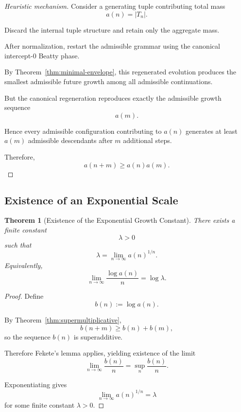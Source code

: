 \documentclass[12pt, oneside]{article}
\numberwithin{equation}{section}
\theoremstyle{definition}
\theoremstyle{plain}
\newtheorem{theorem}{Theorem}[section]
\theoremstyle{remark}
\begin{document}
\begin{proof}[Heuristic mechanism]
Consider a generating tuple contributing total mass
\[
a(n)=|T_n|.
\]

Discard the internal tuple structure and retain only the aggregate
mass.

After normalization, restart the admissible grammar using the
canonical intercept-$0$ Beatty phase.

By Theorem~\ref{thm:minimal-envelope}, this regenerated evolution
produces the smallest admissible future growth among all admissible
continuations.

But the canonical regeneration reproduces exactly the admissible
growth sequence
\[
a(m).
\]

Hence every admissible configuration contributing to $a(n)$
generates at least $a(m)$ admissible descendants after $m$
additional steps.

Therefore,
\[
a(n+m)\ge a(n)a(m).
\]
\end{proof}


\subsection{Existence of an Exponential Scale}


\begin{theorem}[Existence of the Exponential Growth Constant]
\label{thm:lambda-exists}
There exists a finite constant
\[
\lambda>0
\]
such that
\[
\lambda
=
\lim_{n\to\infty} a(n)^{1/n}.
\]
Equivalently,
\[
\lim_{n\to\infty}\frac{\log a(n)}{n}
=
\log\lambda.
\]
\end{theorem}

\begin{proof}
Define
\[
b(n):=\log a(n).
\]

By Theorem~\ref{thm:supermultiplicative},
\[
b(n+m)\ge b(n)+b(m),
\]
so the sequence $b(n)$ is superadditive.

Therefore Fekete's lemma applies, yielding existence of the limit
\[
\lim_{n\to\infty}\frac{b(n)}{n}
=
\sup_n \frac{b(n)}{n}.
\]

Exponentiating gives
\[
\lim_{n\to\infty} a(n)^{1/n}
=
\lambda
\]
for some finite constant $\lambda>0$.
\end{proof}

\end{document}
